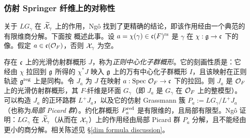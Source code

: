 \subsubsection{仿射 Springer 纤维上的对称性}\label{sss:sym ASF} 关于 $LG_{\gamma}$ 在 $\widetilde{\mathcal{X}}_{\gamma}$ 上的作用，Ng\^o 找到了更精确的结论，即该作用经由一个典范的有限维商分解。下面按 \cite[\S3.3]{NgoFL} 概述此事。设 $a=\chi(\gamma)\in\mathfrak{c}(F)^{\textup{rs}}$ 是 $\gamma$ 在 $\chi:\mathfrak{g}\to \mathfrak{c}$ 下的像。假定 $a\in\mathfrak{c}(\mathcal{O}_{F})$，否则 $\mathcal{X}_{\gamma}$ 为空。

存在 $\mathfrak{c}$ 上的光滑仿射群概形 $J$，称为{\em 正则中心化子群概形}。它的刻画性质是：它经由 $\chi$ 拉回到 $\mathfrak{g}$ 所得的 $\chi^{*}J$ 映入 $\mathfrak{g}$ 上的万有中心化子群概形 $I$，且该映射在正则轨迹 $\mathfrak{g}^{\textup{reg}}$ 上是同构。令 $J_{a}$ 为 $J$ 在映射 $a:\textup{Spec}\ \mathcal{O}_{F}\to \mathfrak{c}$ 下的拉回。则 $J_{a}$ 是 $\mathcal{O}_{F}$ 上的光滑仿射群概形，其 $F$-纤维是环面 $G_{\gamma}$（即 $J_{a}$ 是 $G_{\gamma}$ 在 $\mathcal{O}_{F}$ 上的整模型）。可以构造 $J_{a}$ 的正环路群 $L^{+}J_{a}$，以及它的仿射 Grassmann 簇 $P_{a}:=LG_{\gamma}/L^{+}J_{a}$（也称为{\em 局部 Picard 群}）。约化群概形 $P^{\textup{red}}_{a}$ 是有限维的，且局部有限型。Ng\^o 证明：$LG_{\gamma}$ 在 $\widetilde{\mathcal{X}}_{\gamma}$（从而在 $\mathcal{X}_{\gamma}$）上的作用经由局部 Picard 群 $P_{a}$ 分解，且不能经由更小的商分解。相关陈述见 \S\ref{dim formula discussion}。
